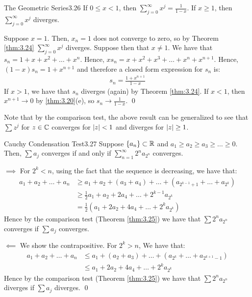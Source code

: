 \begin{theorem}{The Geometric Series}{3.26}
    If $0 \leq x < 1$, then $\sum_{j=0}^\infty x^j = \frac{1}{1-x}$. If $x \geq 1$, then $\sum_{j=0}^\infty x^j$ diverges.
\end{theorem}
\begin{nproof}
    Suppose $x = 1$. Then, $x_n = 1$ does not converge to zero, so by Theorem \ref{thm:3.24} $\sum_{j=0}^\infty x^j$ diverges. Suppose then that $x \neq 1$. We have that $s_n = 1 + x + x^2 + \ldots + x^n$. Hence, $xs_n = x + x^2 + x^3 + \ldots + x^n + x^{n+1}$. Hence, $(1-x)s_n = 1 + x^{n+1}$ and therefore a closed form expression for $s_n$ is:
    \begin{align*}
        s_n = \frac{1 + x^{n+1}}{1 - x}
    \end{align*}
    If $x > 1$, we have that $s_n$ diverges (again) by Theorem \ref{thm:3.24}. If $x < 1$, then $x^{n+1} \rightarrow 0$ by \ref{thm:3.20}(e), so $s_n \rightarrow \frac{1}{1-x}$. \qed
\end{nproof}
\noindent Note that by the comparison test, the above result can be generalized to see that $\sum z^j$ for $z \in \mathbb{C}$ converges for $\abs{z} < 1$ and diverges for $\abs{z} \geq 1$. 

\begin{theorem}{Cauchy Condensation Test}{3.27}
    Suppose $\set{a_n} \subset \mathbb{R}$ and $a_1 \geq a_2 \geq a_3 \geq \ldots \geq 0$. Then, $\sum a_j$ converges if and only if $\sum_{n=1}^\infty 2^n a_{2^n}$ converges.
\end{theorem}
\begin{nproof}
    $\boxed{\implies}$ For $2^k < n$, using the fact that the sequence is decreasing, we have that:
    \begin{align*}
        a_1 + a_2 + \ldots + a_n &\geq a_1 + a_2 + (a_3 + a_4) + \ldots + (a_{2^{k-1}+1} + \ldots + a_{2^k})
        \\ &\geq \frac{1}{2}a_1 + a_2 + 2a_4 + \ldots + 2^{k-1}a_{2^k}
        \\ &= \frac{1}{2}(a_1 + 2a_2 + 4a_4 + \ldots + 2^ka_{2^k})
    \end{align*}
    Hence by the comparison test (Theorem \ref{thm:3.25}) we have that $\sum 2^n a_{2^n}$ converges if $\sum a_j$ converges.

    $\boxed{\impliedby}$ We show the contrapositive. For $2^k > n$, We have that:
    \begin{align*}
        a_1 + a_2 + \ldots + a_n &\leq a_1 + (a_2 + a_3) + \ldots + (a_{2^k} + \ldots + a_{2^{k+1}-1})
        \\ &\leq a_1 + 2a_2 + 4a_4 + \ldots + 2^ka_{2^k}
    \end{align*}
    Hence by the comparison test (Theorem \ref{thm:3.25}) we have that $\sum 2^n a_{2^n}$ diverges if $\sum a_j$ diverges. \qed
\end{nproof}

